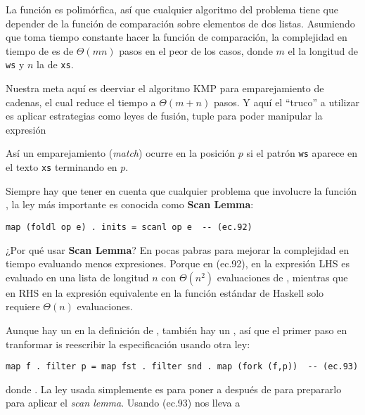 La función  es polimórfica, así que cualquier algoritmo del problema tiene que
depender de la función de comparación  sobre elementos de dos listas.
Asumiendo que toma tiempo constante hacer la función de comparación, la complejidad en tiempo de
 es de $\Theta(mn)$ pasos en el peor de los casos, donde $m$ el la longitud de \texttt{ws} y $n$ la
de \texttt{xs}.

Nuestra meta aquí es deerviar el algoritmo KMP para emparejamiento de cadenas, el cual reduce el tiempo a $\Theta(m+n)$ pasos.
Y aquí el ``truco'' a utilizar es aplicar estrategias como leyes de fusión, tuple %
para poder manipular la expresión %

Así un emparejamiento (\textit{match}) ocurre en la posición $p$ si el patrón \texttt{ws} aparece en el texto \texttt{xs} terminando en $p$.


Siempre hay que tener en cuenta que cualquier problema que involucre la función , la ley más importante es conocida como \textbf{Scan Lemma}: %
\begin{verbatim}
map (foldl op e) . inits = scanl op e  -- (ec.92)
\end{verbatim}

¿Por qué usar \textbf{Scan Lemma}? En pocas pabras para mejorar la complejidad en tiempo evaluando menos expresiones.
Porque en (ec.92), en la expresión LHS es evaluado en una lista de longitud $n$ con $\Theta(n^2)$ evaluaciones de , mientras que
en RHS en la expresión equivalente en la función estándar de Haskell  solo requiere $\Theta(n)$ evaluaciones.

Aunque hay un  en la definición de , también hay un , así que el primer paso en tranformar  is reescribir la especificación usando otra ley: %

\begin{verbatim}
map f . filter p = map fst . filter snd . map (fork (f,p))  -- (ec.93)
\end{verbatim}

donde . La ley usada simplemente es para poner a 
después de  para prepararlo para aplicar el \textit{scan lemma}. Usando (ec.93) nos lleva a

